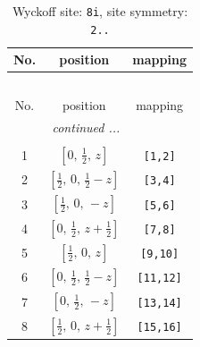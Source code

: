 \documentclass[fleqn,8pt]{jsarticle}
\begin{document}
\renewcommand{\arraystretch}{1.2}
\begin{longtable}{ccc}
\caption{Wyckoff site: {\tt 8i}, site symmetry: {\tt 2..}}
 \\
 \hline \hline
No. & position & mapping \\ \hline \endfirsthead

\multicolumn{2}{l}{\tablename\ \thetable{}} \\
 \hline \hline
No. & position & mapping \\ \hline \endhead

 \hline \hline
\multicolumn{2}{r}{\footnotesize\it continued ...} \\ \endfoot

 \hline \hline
\multicolumn{2}{r}{} \\ \endlastfoot

1 & $\left[ 0,\, \frac{1}{2},\, z \right]$ & {\tt [1,2]} \\ \hline
2 & $\left[ \frac{1}{2},\, 0,\, \frac{1}{2} - z \right]$ & {\tt [3,4]} \\ \hline
3 & $\left[ \frac{1}{2},\, 0,\, - z \right]$ & {\tt [5,6]} \\ \hline
4 & $\left[ 0,\, \frac{1}{2},\, z + \frac{1}{2} \right]$ & {\tt [7,8]} \\ \hline
5 & $\left[ \frac{1}{2},\, 0,\, z \right]$ & {\tt [9,10]} \\ \hline
6 & $\left[ 0,\, \frac{1}{2},\, \frac{1}{2} - z \right]$ & {\tt [11,12]} \\ \hline
7 & $\left[ 0,\, \frac{1}{2},\, - z \right]$ & {\tt [13,14]} \\ \hline
8 & $\left[ \frac{1}{2},\, 0,\, z + \frac{1}{2} \right]$ & {\tt [15,16]} \\
\end{longtable}
\renewcommand{\arraystretch}{1.2}
\end{document}
